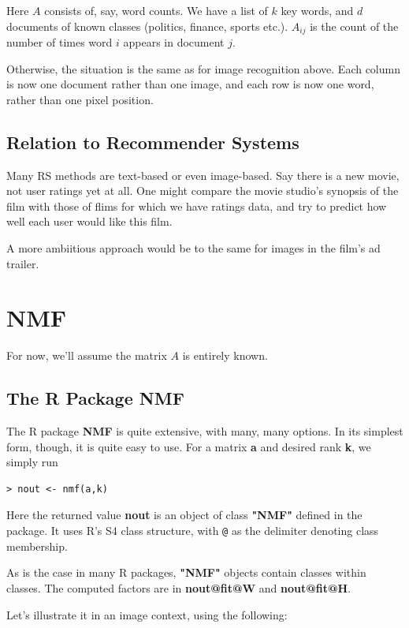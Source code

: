 Here $A$ consists of, say, word counts. We have a list of $k$ key words,
and $d$ documents of known classes (politics, finance, sports etc.).
$A_{ij}$ is the count of the number of times word $i$ appears in
document $j$.

Otherwise, the situation is the same as for image recognition above.
Each column is now one document rather than one image, and each row is
now one word, rather than one pixel position.

\subsection{Relation to Recommender Systems}

Many RS methods are text-based or even image-based.  Say there is a new
movie, not user ratings yet at all.  One might compare the movie
studio's synopsis of the film with those of flims for which we have
ratings data, and try to predict how well each user would like this
film.

A more ambiitious approach would be to the same for images in the film's
ad trailer.

\section{NMF}

For now, we'll assume the matrix $A$ is entirely known.

\subsection{The R Package NMF}

The R package {\bf NMF} is quite extensive, with many, many options.  In
its simplest form, though, it is quite easy to use.  For a matrix {\bf
a} and desired rank {\bf k}, we simply run

\begin{lstlisting}
> nout <- nmf(a,k)
\end{lstlisting}

Here the returned value {\bf nout} is an object of class {\bf "NMF"}
defined in the package.  It uses R's S4 class structure, with
\lstinline{@} as the delimiter denoting class membership.  

As is the case in many R packages, {\bf "NMF"} objects contain classes
within classes.  The computed factors are in {\bf nout@fit@W} and {\bf
nout@fit@H}.

Let's illustrate it in an image context, using the following:

